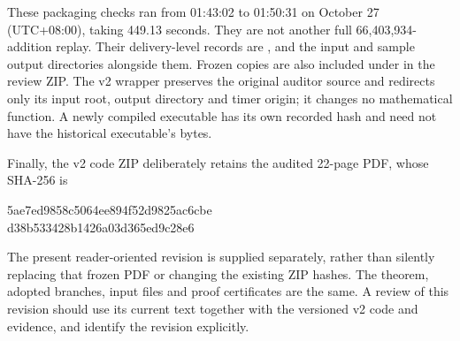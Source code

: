 These packaging checks ran from 01:43:02 to 01:50:31 on October 27
(UTC+08:00), taking 449.13 seconds. They are not another full
66,403,934-addition replay. Their delivery-level records are
,
 and the input
and sample output directories alongside them. Frozen copies are also
included under  in the review ZIP.
The v2 wrapper preserves the original auditor source and redirects only
its input root, output directory and timer origin; it changes no
mathematical function. A newly compiled executable has its own recorded
hash and need not have the historical executable's bytes.

Finally, the v2 code ZIP deliberately retains the audited 22-page PDF,
whose SHA-256 is
\begin{center}\small\ttfamily
5ae7ed9858c5064ee894f52d9825ac6cbe\\
d38b533428b1426a03d365ed9c28e6
\end{center}
The present reader-oriented revision is supplied separately, rather than
silently replacing that frozen PDF or changing the existing ZIP hashes.
The theorem, adopted branches, input files and proof certificates are the
same. A review of this revision should use its current text together with
the versioned v2 code and evidence, and identify the revision explicitly.
